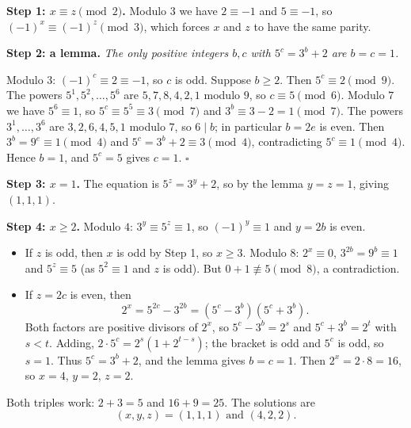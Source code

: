\textbf{Step 1: $x\equiv z\pmod 2$.} Modulo $3$ we have $2\equiv-1$ and $5\equiv-1$, so $(-1)^x\equiv(-1)^z\pmod3$, which forces $x$ and $z$ to have the same parity.

\textbf{Step 2: a lemma.} \emph{The only positive integers $b,c$ with $5^c=3^b+2$ are $b=c=1$.}

Modulo $3$: $(-1)^c\equiv2\equiv-1$, so $c$ is odd. Suppose $b\ge2$. Then $5^c\equiv2\pmod9$. The powers $5^1,5^2,\dots,5^6$ are $5,7,8,4,2,1$ modulo $9$, so $c\equiv5\pmod6$. Modulo $7$ we have $5^6\equiv1$, so $5^c\equiv5^5\equiv3\pmod7$ and $3^b\equiv3-2=1\pmod7$. The powers $3^1,\dots,3^6$ are $3,2,6,4,5,1$ modulo $7$, so $6\mid b$; in particular $b=2e$ is even. Then $3^b=9^e\equiv1\pmod4$ and $5^c=3^b+2\equiv3\pmod4$, contradicting $5^c\equiv1\pmod4$. Hence $b=1$, and $5^c=5$ gives $c=1$. $\square$

\textbf{Step 3: $x=1$.} The equation is $5^z=3^y+2$, so by the lemma $y=z=1$, giving $(1,1,1)$.

\textbf{Step 4: $x\ge2$.} Modulo $4$: $3^y\equiv5^z\equiv1$, so $(-1)^y\equiv1$ and $y=2b$ is even.
\begin{itemize}
\item If $z$ is odd, then $x$ is odd by Step 1, so $x\ge3$. Modulo $8$: $2^x\equiv0$, $3^{2b}=9^b\equiv1$ and $5^z\equiv5$ (as $5^2\equiv1$ and $z$ is odd). But $0+1\not\equiv5\pmod8$, a contradiction.
\item If $z=2c$ is even, then
\[2^x=5^{2c}-3^{2b}=\left(5^c-3^b\right)\left(5^c+3^b\right).\]
Both factors are positive divisors of $2^x$, so $5^c-3^b=2^s$ and $5^c+3^b=2^t$ with $s<t$. Adding, $2\cdot5^c=2^s\left(1+2^{t-s}\right)$; the bracket is odd and $5^c$ is odd, so $s=1$. Thus $5^c=3^b+2$, and the lemma gives $b=c=1$. Then $2^x=2\cdot8=16$, so $x=4$, $y=2$, $z=2$.
\end{itemize}

Both triples work: $2+3=5$ and $16+9=25$. The solutions are
\[(x,y,z)=\boxed{(1,1,1)\text{ and }(4,2,2)}.\]
